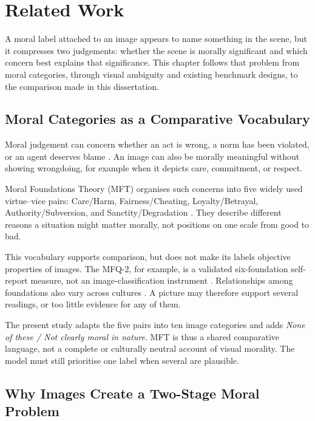 \chapter{Related Work}
\label{chap:related_work}

A moral label attached to an image appears to name something in the scene, but
it compresses two judgements: whether the scene is morally significant and
which concern best explains that significance. This chapter follows that
problem from moral categories, through visual ambiguity and existing benchmark
designs, to the comparison made in this dissertation.


\section{Moral Categories as a Comparative Vocabulary}
\label{sec:moral_foundations}

Moral judgement can concern whether an act is wrong, a norm has been violated,
or an agent deserves blame \cite{malle2021moral}. An image can also be morally
meaningful without showing wrongdoing, for example when it depicts care,
commitment, or respect.

Moral Foundations Theory (MFT) organises such concerns into five widely used
virtue--vice pairs: Care/Harm, Fairness/Cheating, Loyalty/Betrayal,
Authority/Subversion, and Sanctity/Degradation
\cite{graham2009liberals,graham2011mapping}. They describe different reasons a
situation might matter morally, not positions on one scale from good to bad.

This vocabulary supports comparison, but does not make its labels objective
properties of images. The MFQ-2, for example, is a validated six-foundation
self-report measure, not an image-classification instrument
\cite{zakharin2023mfq2}. Relationships among foundations also vary across
cultures \cite{atari2023weird}. A picture may therefore support several
readings, or too little evidence for any of them.

The present study adapts the five pairs into ten image categories and adds
\textit{None of these / Not clearly moral in nature}. MFT is thus a shared
comparative language, not a complete or culturally neutral account of visual
morality. The model must still prioritise one label when several are plausible.


\section{Why Images Create a Two-Stage Moral Problem}
\label{sec:visual_moral_inference}


